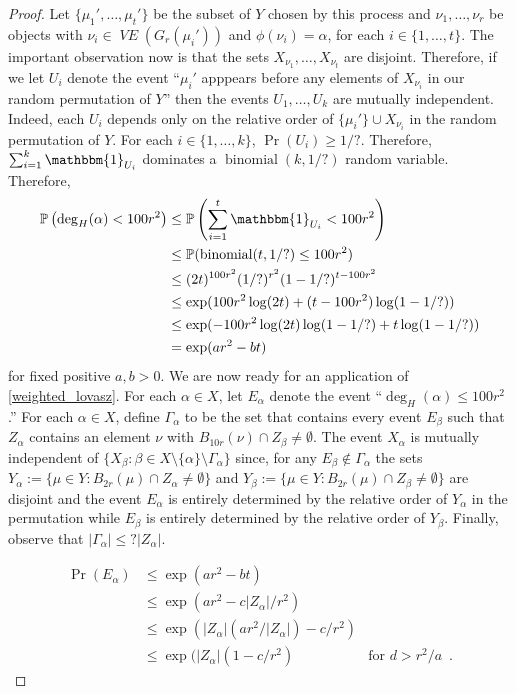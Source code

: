 \documentclass{patmorin}
\DeclareMathOperator{\binomial}{binomial}
\DeclareMathOperator{\VE}{\mathit{VE}}
\begin{document}
\begin{proof}
  Let $\{\mu_1',\ldots,\mu_t'\}$ be the subset of $Y$ chosen by this process and $\nu_1,\ldots,\nu_r$ be objects with $\nu_i\in\VE(G_r(\mu_i'))$ and $\phi(\nu_i)=\alpha$, for each $i\in\{1,\ldots,t\}$.  The important observation now is that the sets $X_{\nu_1},\ldots,X_{\nu_t}$ are disjoint.  Therefore, if we let $U_i$ denote the event ``$\mu_i'$ apppears before any elements of $X_{\nu_i}$ in our random permutation of $Y$'' then the events $U_1,\ldots,U_k$ are mutually independent.  Indeed, each $U_i$ depends only on the relative order of $\{\mu_i'\}\cup X_{\nu_i}$ in the random permutation of $Y$.  For each $i\in\{1,\ldots,k\}$, $\Pr(U_i)\ge 1/?$.  Therefore, $\sum_{i=1}^k \mathbbm{1}_{U_i}$ dominates a $\binomial(k,1/?)$ random variable.  Therefore,
  \begin{align*}
    \Pr\left(\deg_H(\alpha)< 100r^2\right)
    & \le \Pr\left(\sum_{i=1}^t \mathbbm{1}_{U_i} < 100r^2\right) \\
    & \le \Pr(\binomial(t,1/?)\le 100r^2) \\
    & \le (2t)^{100r^2}(1/?)^{r^2}(1-1/?)^{t-100r^2} \\
    & \le \exp(100r^2\log(2t)+(t-100r^2)\log(1-1/?)) \\
    & \le \exp(-100r^2\log(2t)\log(1-1/?) + t\log(1-1/?)) \\
    & = \exp(ar^2 - bt)
  \end{align*}
  for fixed positive $a,b>0$.
  We are now ready for an application of \cref{weighted_lovasz}.  For each $\alpha\in X$, let $E_\alpha$ denote the event ``$\deg_H(\alpha)\le 100r^2$.''  For each $\alpha\in X$, define $\Gamma_\alpha$ to be the set that contains every event $E_\beta$ such that $Z_\alpha$ contains an element $\nu$ with $B_{10r}(\nu)\cap Z_\beta\neq\emptyset$.  The event $X_\alpha$ is mutually independent of $\{X_\beta:\beta\in X\setminus\{\alpha\}\setminus\Gamma_\alpha\}$ since, for any $E_\beta\not\in \Gamma_\alpha$ the sets $Y_\alpha:=\{\mu\in Y:B_{2r}(\mu)\cap Z_\alpha\neq\emptyset\}$ and $Y_\beta:=\{\mu\in Y:B_{2r}(\mu)\cap Z_\beta\neq\emptyset\}$ are disjoint and the event $E_\alpha$ is entirely determined by the relative order of $Y_\alpha$ in the permutation while $E_\beta$ is entirely determined by the relative order of $Y_\beta$.   Finally, observe that $|\Gamma_\alpha|\le ?|Z_\alpha|$.

  \begin{align*}
      \Pr(E_\alpha)
      & \le \exp(ar^2-bt) \\
      & \le \exp(ar^2-c|Z_\alpha|/r^2) \\
      & \le \exp(|Z_\alpha|(ar^2/|Z_\alpha|)-c/r^2) \\
      & \le \exp(|Z_\alpha|(1-c/r^2) & \text{for $d>r^2/a$} \enspace .
  \end{align*}


\end{proof}
\end{document}
